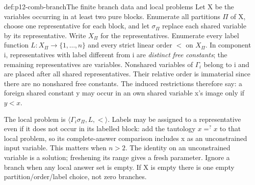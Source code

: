 \begin{hbmethod}{def:p12-comb-branch}{The finite branch data and local problems}
Let X be the variables occurring in at least two pure blocks. Enumerate
all partitions \(\Pi\) of X, choose one representative for each block,
and let \(\sigma_\Pi\) replace each shared variable by its representative.
Write \(X_\Pi\) for the representatives. Enumerate every label function
\(L:X_\Pi\longrightarrow\{1,\ldots,n\}\) and every strict linear order
\(<\) on \(X_\Pi\). In component i, representatives with label different
from i are \emph{distinct free constants}; the remaining representatives
are variables. Nonshared variables of \(\Gamma_i\) belong to i and
are placed after all shared representatives. Their relative order is
immaterial since there are no nonshared free constants. The induced
restrictions therefore say: a foreign shared constant y may occur
in an own shared variable x's image only if \(y<x\).

The local problem is \(\langle\Gamma_i\sigma_\Pi,L,<\rangle\).
Labels may be assigned to a representative even if it does not occur
in its labelled block: add the tautology \(x=^{?}x\) to that local
problem, so its complete-answer comparison includes x as an
unconstrained input variable. This matters when \(n>2\).
The identity on an unconstrained variable is a solution; freshening its
range gives a fresh parameter. Ignore a branch when any local answer
set is empty. If X is empty there is one empty partition/order/label
choice, not zero branches.
\cite[pp.~515--517, including footnote~21]{BaaderSnyder2001}
\end{hbmethod}

